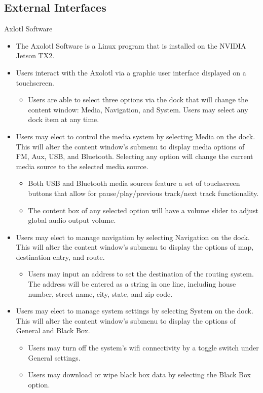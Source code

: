 \documentclass[onecolumn, draftclsnofoot,10pt, compsoc]{IEEEtran}
\begin{document}
\subsection{External Interfaces}
Axlotl Software
\begin{itemize}
	\item The Axolotl Software is a Linux program that is installed on the NVIDIA Jetson TX2.
	\item Users interact with the Axolotl via a graphic user interface displayed on a touchscreen.
	\begin{itemize}
		\item Users are able to select three options via the dock that will change the content window: Media, Navigation, and System. Users may select any dock item at any time.
	\end{itemize}
	\item Users may elect to control the media system by selecting Media on the dock. This will alter the content window’s submenu to display media options of FM, Aux, USB, and Bluetooth. Selecting any option will change the current media source to the selected media source.
	\begin{itemize}
		\item Both USB and Bluetooth media sources feature a set of touchscreen buttons that allow for pause/play/previous track/next track functionality.
		\item The content box of any selected option will have a volume slider to adjust global audio output volume.
	\end{itemize}
	\item Users may elect to manage navigation by selecting Navigation on the dock. This will alter the content window’s submenu to display the options of map, destination entry, and route.
	\begin{itemize}
		\item Users may input an address to set the destination of the routing system. The address will be entered as a string in one line, including house number, street name, city, state, and zip code.
	\end{itemize}
	\item Users may elect to manage system settings by selecting System on the dock. This will alter the content window’s submenu to display the options of General and Black Box.
	\begin{itemize}
		\item Users may turn off the system’s wifi connectivity by a toggle switch under General settings.
		\item Users may download or wipe black box data by selecting the Black Box option.
	\end{itemize}
\end{itemize}
\end{document}
